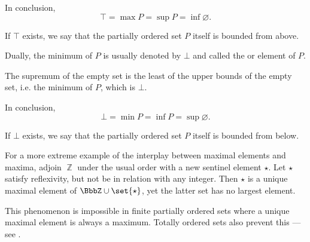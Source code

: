 \begin{definition}
\begin{thmenum}
\begin{minipage}[t]{0.45\textwidth}
      In conclusion,
      \begin{equation*}
        \top = \max P = \sup P = \inf \varnothing.
      \end{equation*}

      If \( \top \) exists, we say that the partially ordered set \( P \) itself is bounded from above.
    \end{minipage}
    \hspace{0.02\textwidth}
    \begin{minipage}[t]{0.45\textwidth}
      Dually, the minimum of \( P \) is usually denoted by \( \bot \) and called the  or  element of \( P \).

      The supremum of the empty set is the least of the upper bounds of the empty set, i.e. the minimum of \( P \), which is \( \bot \).

      In conclusion,
      \begin{equation*}
        \bot = \min P = \inf P = \sup \varnothing.
      \end{equation*}

      If \( \bot \) exists, we say that the partially ordered set \( P \) itself is bounded from below.
    \end{minipage}
  \end{thmenum}
\end{definition}

\begin{example}\label{ex:unique_maximal_element_that_is_not_maximum}
  For a more extreme example of the interplay between maximal elements and maxima, adjoin \( \BbbZ \) under the usual order with a new sentinel element \( \star \). Let \( \star \) satisfy reflexivity, but not be in relation with any integer. Then \( \star \) is a unique maximal element of \( \BbbZ \cup \set{ \star } \), yet the latter set has no largest element.

  This phenomenon is impossible in finite partially ordered sets where a unique maximal element is always a maximum. Totally ordered sets also prevent this --- see .
\end{example}

